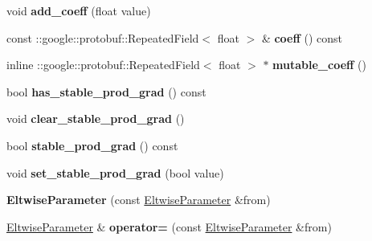 \begin{DoxyCompactItemize}
void {\bfseries add\+\_\+coeff} (float value)
\item 
\mbox{\label{classcaffe_1_1_eltwise_parameter_a54322b86a89e3a4e20a6f6e634c13122}} 
const \+::google\+::protobuf\+::\+Repeated\+Field$<$ float $>$ \& {\bfseries coeff} () const
\item 
\mbox{\label{classcaffe_1_1_eltwise_parameter_af7cf52af6d84f21556a7c7d64fa34992}} 
inline \+::google\+::protobuf\+::\+Repeated\+Field$<$ float $>$ $\ast$ {\bfseries mutable\+\_\+coeff} ()
\item 
\mbox{\label{classcaffe_1_1_eltwise_parameter_abace0ef7da67158c866f6f8589d9674d}} 
bool {\bfseries has\+\_\+stable\+\_\+prod\+\_\+grad} () const
\item 
\mbox{\label{classcaffe_1_1_eltwise_parameter_abafdba670525d20ce2108083da7cecac}} 
void {\bfseries clear\+\_\+stable\+\_\+prod\+\_\+grad} ()
\item 
\mbox{\label{classcaffe_1_1_eltwise_parameter_a64e041c34d899d4cecd0b3db34dc2c98}} 
bool {\bfseries stable\+\_\+prod\+\_\+grad} () const
\item 
\mbox{\label{classcaffe_1_1_eltwise_parameter_a400f96405dfce6e32f8e26659007f04d}} 
void {\bfseries set\+\_\+stable\+\_\+prod\+\_\+grad} (bool value)
\item 
\mbox{\label{classcaffe_1_1_eltwise_parameter_a7d4c4ff10f8ba9753dbf772c47b5748d}} 
{\bfseries Eltwise\+Parameter} (const \mbox{\hyperlink{classcaffe_1_1_eltwise_parameter}{Eltwise\+Parameter}} \&from)
\item 
\mbox{\label{classcaffe_1_1_eltwise_parameter_a4376fc60e00a4eb557c1e60659805965}} 
\mbox{\hyperlink{classcaffe_1_1_eltwise_parameter}{Eltwise\+Parameter}} \& {\bfseries operator=} (const \mbox{\hyperlink{classcaffe_1_1_eltwise_parameter}{Eltwise\+Parameter}} \&from)
\item 
\mbox{\label{classcaffe_1_1_eltwise_parameter_a3705269fd06c91a1819f082bebe3ac4a}} 

\end{DoxyCompactItemize}
